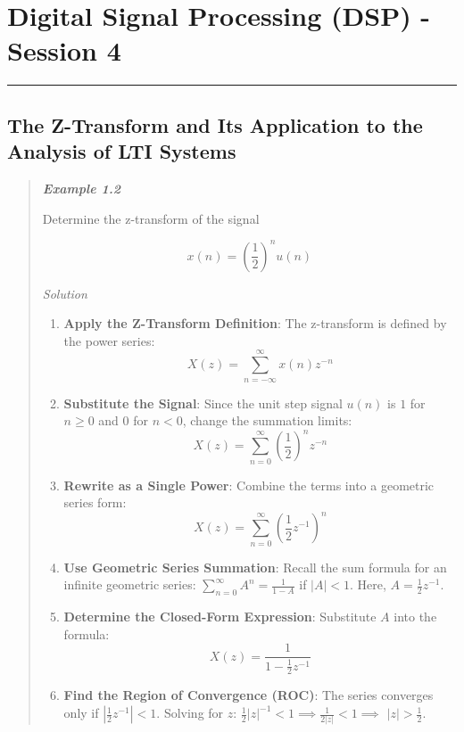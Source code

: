 \section{Digital Signal Processing (DSP) - Session
4}\label{digital-signal-processing-dsp---session-4}

\begin{center}\rule{0.5\linewidth}{0.5pt}\end{center}

\subsection{The Z-Transform and Its Application to the Analysis of LTI
Systems}\label{the-z-transform-and-its-application-to-the-analysis-of-lti-systems}

\begin{quote}
\textbf{\emph{Example 1.2}}

Determine the z-transform of the signal

\[x(n) = (\frac{1}{2})^nu(n)\]

\emph{Solution}

\begin{enumerate}
\def\labelenumi{\arabic{enumi}.}
\item
  \textbf{Apply the Z-Transform Definition}: The z-transform is defined
  by the power series: \[X(z) = \sum_{n=-\infty}^{\infty} x(n)z^{-n}\]
\item
  \textbf{Substitute the Signal}: Since the unit step signal
  \textbf{\(u(n)\)} is \(1\) for \(n \ge 0\) and \(0\) for \(n < 0\),
  change the summation limits:
  \[X(z) = \sum_{n=0}^{\infty} \left(\frac{1}{2}\right)^n z^{-n}\]
\item
  \textbf{Rewrite as a Single Power}: Combine the terms into a geometric
  series form:
  \[X(z) = \sum_{n=0}^{\infty} \left(\frac{1}{2} z^{-1}\right)^n\]
\item
  \textbf{Use Geometric Series Summation}: Recall the sum formula for an
  infinite geometric series: \(\sum_{n=0}^{\infty} A^n = \frac{1}{1-A}\)
  if \(|A| < 1\). Here, \(A = \frac{1}{2} z^{-1}\).
\item
  \textbf{Determine the Closed-Form Expression}: Substitute \(A\) into
  the formula: \textbf{\[X(z) = \frac{1}{1 - \frac{1}{2} z^{-1}}\]}
\item
  \textbf{Find the Region of Convergence (ROC)}: The series converges
  only if \(|\frac{1}{2} z^{-1}| < 1\). Solving for \(z\):
  \(\frac{1}{2} |z|^{-1} < 1 \implies \frac{1}{2|z|} < 1 \implies\)
  \textbf{\(|z| > \frac{1}{2}\)}.
\end{enumerate}
\end{quote}

